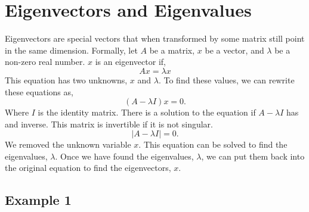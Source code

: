 \documentclass{article}
\begin{document}
\section{Eigenvectors and Eigenvalues}

Eigenvectors are special vectors that when transformed by some matrix still point in the same dimension. Formally, let $A$ be a matrix, $x$ be a vector, and $\lambda$ be a non-zero real number. $x$ is an eigenvector if,
\begin{equation}
    A x = \lambda x
\end{equation}
This equation has two unknowns, $x$ and $\lambda$. To find these values, we can rewrite these equations as,
\begin{equation}
    (A - \lambda I) x = 0.
\end{equation}
Where $I$ is the identity matrix. There is a solution to the equation if $A - \lambda I$ has and inverse. This matrix is invertible if it is not singular.
\begin{equation}
    | A - \lambda I | = 0.
\end{equation}
We removed the unknown variable $x$. This equation can be solved to find the eigenvalues, $\lambda$. Once we have found the eigenvalues, $\lambda$, we can put them back into the original equation to find the eigenvectors, $x$.

\subsection{Example 1}
\end{document}
